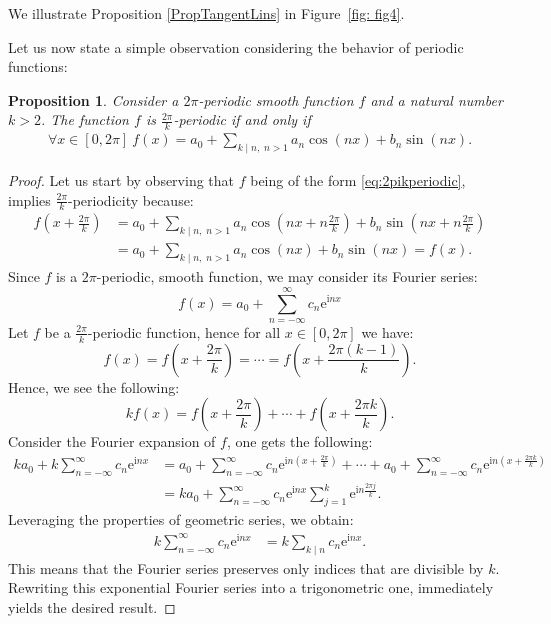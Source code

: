 \documentclass{amsart}
\newtheorem{prop}[thm]{Proposition}
\theoremstyle{definition}
\numberwithin{equation}{section}
\newcommand{\e}{\mathrm{e}}
\renewcommand{\i}{\mathrm{i}}
\begin{document}
We illustrate Proposition \ref{PropTangentLins} in Figure~\ref {fig: fig4}.

\noindent Let us now state a simple observation considering the behavior of periodic functions:
\begin{prop}\label{kperiodic}
    Consider a $2\pi$-periodic smooth function $f$ and a natural number $k > 2$. The function $f$ is $\frac{2\pi}{k}$-periodic if and only if 
    \begin{align}
    \label{eq:2pikperiodic}\forall{x\in[0,2\pi]}\ f(x) = a_0 + \sum_{k\mid n, \;n>1}a_n\cos(nx)+b_n\sin(nx).\end{align}
\end{prop}
\begin{proof}
Let us start by observing that $f$ being of the form \eqref{eq:2pikperiodic}, implies \linebreak $\frac{2\pi}{k}$-periodicity because:
\begin{align*}
    f\left(x+\frac{2\pi}{k}\right) &= a_0 +\sum_{k\mid n, \;n>1}a_n\cos\left(nx+n\frac{2\pi}{k}\right)+b_n\sin\left(nx+ n\frac{2\pi}{k}\right) \\&= a_0+\sum_{k\mid n, \;n>1}a_n\cos(nx)+b_n\sin(nx) = f(x).
\end{align*}
    Since $f$ is a $2\pi$-periodic, smooth function, we may consider its Fourier series:
    $$ f(x) = a_0 + \sum_{n=-\infty}^\infty c_n{\e}^{\i nx}$$
    Let $f$ be a $\frac{2\pi}{k}$-periodic function, hence for all $x \in [0,2\pi]$ we have:
    $$f(x) = f\left(x + \frac{2\pi}{k}\right)= \cdots=f\left(x + \frac{2\pi(k-1)}{k}\right) .$$
    Hence, we see the following:
    $$kf(x) = f\left(x + \frac{2\pi}{k}\right)+ \cdots+f\left(x + \frac{2\pi k}{k}\right).$$
    Consider the Fourier expansion of $f$, one gets the following:
    \begin{align*}
        ka_0 + k\sum_{n=-\infty}^\infty c_n{\e}^{\i nx}&=a_0 + \sum_{n=-\infty}^\infty c_n{\e}^{\i n(x+\frac{2\pi}{k})} +\cdots +a_0 + \sum_{n=-\infty}^\infty c_n{\e}^{\i n\left(x+\frac{2\pi k}{k}\right)}\\
        &= ka_0 + \sum_{n = -\infty}^\infty c_n {\e}^{\i nx}\sum_{j=1}^{k}{\e}^{\i n\frac{2\pi j}{k}}.
    \end{align*}
    Leveraging the properties of geometric series, we obtain:
    \begin{align*}
        k\sum_{n=-\infty}^\infty c_n{\e}^{\i nx}
        &= k\sum_{k\mid n} c_n {\e}^{\i nx} 
        .
    \end{align*}
    This means that the Fourier series preserves only indices that are divisible by $k$. Rewriting this exponential Fourier series into a trigonometric one, immediately yields the desired result.
\end{proof}
\end{document}
